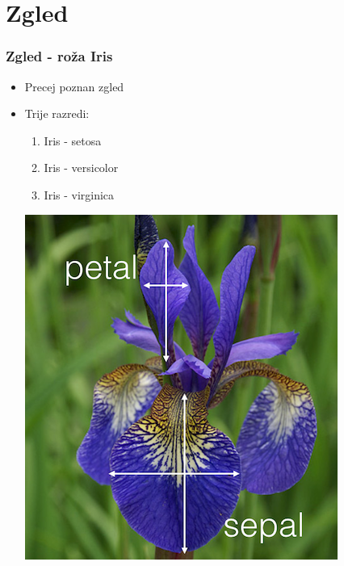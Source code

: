 \documentclass{beamer}
\begin{document}
\section{Zgled}

\begin{frame}
\frametitle{Zgled - roža Iris}
\begin{itemize}
\item Precej poznan zgled
\item Trije razredi:
\begin{enumerate}
\item Iris - setosa
\item Iris - versicolor
\item Iris - virginica
\end{enumerate}
\includegraphics[scale = 0.30]{Iris1}
\end{itemize}
\end{frame}
\end{document}
